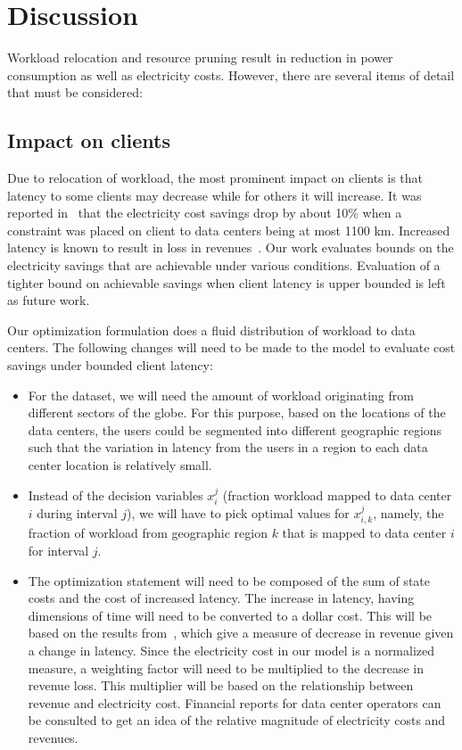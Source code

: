 \section{Discussion}
Workload relocation and resource pruning result in reduction in power consumption as well as electricity costs. However, there are several items of detail that must be considered:

\subsection{Impact on clients} Due to relocation of workload, the most prominent impact on clients is that latency to some clients may decrease while for others it will increase. It was reported in~\cite{qureshi2009cutting} that the electricity cost savings drop by about 10\% when a constraint was placed on client to data centers being at most 1100 km. Increased latency is known to result in loss in revenues~\cite{schuramn:latencycost:2009:velocity}. Our work evaluates bounds on the electricity savings that are achievable under various conditions. Evaluation of a tighter bound on achievable savings when client latency is upper bounded is left as future work. 

Our optimization formulation does a fluid distribution of workload to data centers. The following changes will need to be made to the model to evaluate cost savings under bounded client latency:

\begin{itemize}
\item For the dataset, we will need the amount of workload originating from different sectors of the globe. For this purpose, based on the locations of the data centers, the users could be segmented into different geographic regions such that the variation in latency from the users in a region to each data center location is relatively small. 
\item Instead of the decision variables $x_i^j$ (fraction workload mapped to data center $i$ during interval $j$), we will have to pick optimal values for $x_{i,k}^j$, namely, the fraction of workload from geographic region $k$ that is mapped to data center $i$ for interval $j$.
\item The optimization statement will need to be composed of the sum of state costs and the cost of increased latency. The increase in latency, having dimensions of time will need to be converted to a dollar cost. This will be based on the results from~\cite{schuramn:latencycost:2009:velocity}, which give a measure of decrease in revenue given a change in latency. Since the electricity cost in our model is a normalized measure, a weighting factor will need to be multiplied to the decrease in revenue loss. This multiplier will be based on the relationship between revenue and electricity cost. Financial reports for data center operators can be consulted to get an idea of the relative magnitude of electricity costs and revenues.
\end{itemize}

